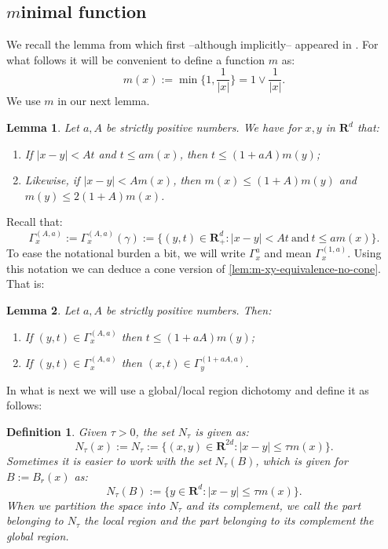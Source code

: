 \documentclass[a4paper,oneside,10pt]{amsproc}
\theoremstyle{plain}
\newtheorem{definition}{Definition}
\newtheorem{lemma}{Lemma}
\theoremstyle{remark}
\theoremstyle{definition}
\renewcommand{\leq}{\leqslant}
\renewcommand{\leq}{\leqslant}
\newcommand{\R}{\mathbf R}
\renewcommand{\leq}{\leqslant}%
\begin{document}
\subsection{$m$inimal function}
We recall the lemma from \cite[lemma 2.3]{Maas2011b} which first
--although implicitly-- appeared in \cite{Mauceri2007}. For what
follows it will be convenient to define a function $m$ as:
\begin{equation*}
  m(x) := \min\biggl\{1, \frac1{|x|} \biggr\} = 1 \vee \frac1{|x|}.
\end{equation*}
We use $m$ in our next lemma.
\begin{lemma}\label{lem:m-xy-equivalence-no-cone}
  Let $a, A$ be strictly positive numbers. We have for $x, y$
  in $\R^d$ that:
  \begin{enumerate}
  \item If $|x - y| < A t$ and $t \leq a m(x)$, then $t
    \leq (1 + aA) m(y)$;
  \item Likewise, if $|x - y| < A m(x)$, then $m(x) \leq (1 +
    A) m(y)$ and $m(y) \leq 2 (1 + A) m(x)$. 
  \end{enumerate}
\end{lemma}
Recall that:
\begin{equation}
  \label{eq:Gaussian-cone}
  \Gamma_x^{(A, a)} := \Gamma_x^{(A, a)}(\gamma) := \{(y, t) \in
  \R^d_+ : |x - y| < At \:\text{and}\: t \leq a m(x)\}.
\end{equation}
To ease the notational burden a bit, we will write $\Gamma_x^a$ and
mean $\Gamma_x^{(1, a)}$. Using this notation we can deduce a cone
version of \autoref{lem:m-xy-equivalence-no-cone}. That is:
\begin{lemma}\label{lem:m-xy-equivalence}
  Let $a, A$ be strictly positive numbers. Then:
  \begin{enumerate}
  \item If $(y, t) \in \Gamma_x^{(A, a)}$ then $t \leq (1 + aA) m(y)$;
  \item If $(y, t) \in \Gamma_x^{(A, a)}$ then  $(x, t) \in
    \Gamma_y^{(1 + aA, a)}$.
  \end{enumerate}
\end{lemma}
In what is next we will use a global/local region dichotomy and define
it as follows:
\begin{definition}
  Given $\tau > 0$, the set $N_\tau$ is given as:
  \begin{equation}
    \label{eq:Definition-local-region}
    N_\tau(x) := N_\tau := \{(x, y) \in \R^{2d} : |x - y| \leq \tau
    m(x) \}.
  \end{equation}
  Sometimes it is easier to work with the set $N_\tau(B)$, which is
  given for $B := B_r(x)$ as:
  \begin{equation}
    \label{eq:Definition-local-region-ball}
    N_\tau(B) := \{y \in \R^d : |x - y| \leq \tau m(x) \}.
  \end{equation}
  When we partition the space into $N_\tau$ and its complement, we
  call the part belonging to $N_\tau$ the \emph{local region} and the
  part belonging to its complement the \emph{global region}.
\end{definition}
\end{document}
